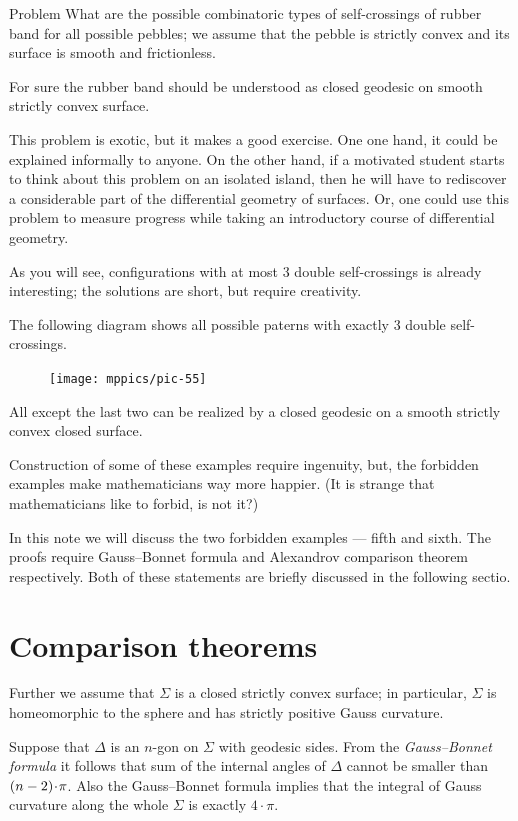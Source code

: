\documentclass[oneside,a4paper]{amsart}
\begin{document}
\begin{thm}{Problem} What are the possible combinatoric types of self-crossings of rubber band for all possible pebbles; we assume that the pebble is strictly convex and its surface is smooth
and frictionless.
\end{thm}

For sure the rubber band should be understood as closed geodesic on smooth strictly convex surface.

This problem is exotic, but it makes a good exercise.
One one hand, it could be explained informally to anyone.
On the other hand, if a motivated student starts to think about this problem on an isolated island, then he will have to rediscover  a considerable part of the differential geometry of surfaces.
Or, one could use this problem to measure progress while taking an introductory course of differential geometry.

As you will see, configurations with at most 3 double self-crossings is already interesting;
the solutions are short, but require creativity.

The following diagram shows all possible paterns with exactly 3 double self-crossings.
\begin{figure}[ht!]
\begin{center}
\texttt{[image: mppics/pic-55]}
\end{center}
\end{figure}
All except the last two can be realized by a closed geodesic on a smooth strictly convex closed surface.

Construction of some of these examples require ingenuity,
but, the forbidden examples make mathematicians way more happier.
(It is strange that mathematicians like to forbid, is not it?)

In this note we will discuss the two forbidden examples --- fifth and sixth.
The proofs require Gauss--Bonnet formula and Alexandrov comparison theorem respectively.
Both of these statements are briefly discussed in the following sectio.

\section*{Comparison theorems}

Further we assume that $\Sigma$ is a closed strictly convex surface;
in particular, $\Sigma$ is homeomorphic to the sphere and has strictly positive Gauss curvature.

Suppose that $\Delta$ is an $n$-gon on $\Sigma$ with geodesic sides.
From the \emph{Gauss--Bonnet formula} it follows that sum of the internal angles of $\Delta$ cannot be smaller than $(n\z-2)\cdot\pi$.
Also the Gauss--Bonnet formula implies that the integral of Gauss curvature along the whole $\Sigma$ is exactly $4\cdot\pi$.
\end{document}

